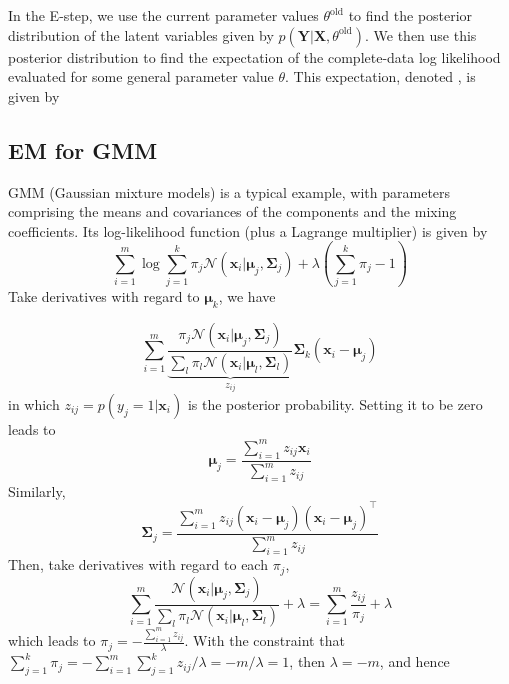 \documentclass{article}
\begin{document}
	In the E-step, we use the current parameter values $\theta^{\mathrm{old}}$ to find the posterior distribution of the latent variables given by $p(\bm{Y}|\bm{X}, \theta^{\mathrm{old}})$. We then use this posterior distribution to find the expectation of the complete-data log likelihood evaluated for some general parameter value $\theta$. This expectation, denoted , is given by
	
	\subsection{EM for GMM}
	
	GMM (Gaussian mixture models) is a typical example, with parameters comprising the means and covariances of the components and the mixing coefficients. Its log-likelihood function (plus a Lagrange multiplier) is given by
	\begin{equation*}
	\sum_{i=1}^m \log \sum_{j=1}^k \pi_j \mathcal{N} (\bm{x}_i|\bm{\mu}_j,\bm{\Sigma}_j) + \lambda \left(\sum_{j=1}^k \pi_j - 1\right)
	\end{equation*}
	Take derivatives with regard to $\bm{\mu}_k$, we have
	
	\begin{equation*}
	\sum_{i=1}^m \underbrace{\frac{\pi_j  \mathcal{N} (\bm{x}_i|\bm{\mu}_j,\bm{\Sigma}_j)}{\sum_l \pi_l \mathcal{N} (\bm{x}_i|\bm{\mu}_l,\bm{\Sigma}_l)}}_{z_{ij}} \bm{\Sigma}_k (\bm{x}_i - \bm{\mu}_j)
	\end{equation*}
in which $z_{ij}=p(y_j=1|\bm{x}_i)$ is the posterior probability. Setting it to be zero leads to
	\begin{equation}
	\label{eq:GMM_mu}
	\bm{\mu}_j=\frac{\sum_{i=1}^m z_{ij} \bm{x}_i}{\sum_{i=1}^m z_{ij}}
	\end{equation}
Similarly,
	\begin{equation}
	\label{eq:GMM_sigma}
	\bm{\Sigma}_j=\frac{\sum_{i=1}^m z_{ij} (\bm{x}_i-\bm{\mu}_j)(\bm{x}_i-\bm{\mu}_j)^\top}{\sum_{i=1}^m z_{ij}}
	\end{equation}
	Then, take derivatives with regard to each $\pi_j$,
	\begin{equation*}
	\sum_{i=1}^m \frac{\mathcal{N} (\bm{x}_i|\bm{\mu}_j,\bm{\Sigma}_j) }{\sum_l \pi_l \mathcal{N} (\bm{x}_i|\bm{\mu}_l,\bm{\Sigma}_l)} + \lambda = \sum_{i=1}^m \frac{z_{ij}}{\pi_j} + \lambda
	\end{equation*}
which leads to $\pi_j=-\frac{\sum_{i=1}^m z_{ij}}{\lambda}$. With the constraint that $\sum_{j=1}^k\pi_j=-\sum_{i=1}^m\sum_{j=1}^k z_{ij}/\lambda = -m/\lambda=1$, then $\lambda=-m$, and hence
\end{document}
